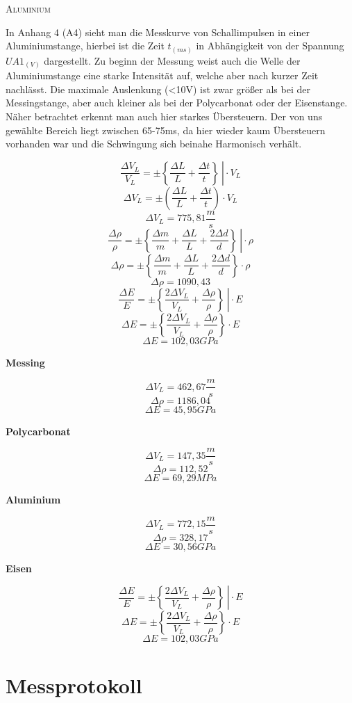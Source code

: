 \documentclass[11pt, a4paper]{article}
\begin{document}
\begin{center}
\textsc{Aluminium}
\end{center}

In Anhang 4 (A4) sieht man die Messkurve von Schallimpulsen in einer Aluminiumstange, hierbei ist die Zeit $t_{(ms)}$ in Abhängigkeit von der Spannung $UA1_{(V)}$ dargestellt. Zu beginn der Messung weist auch die Welle der Aluminiumstange eine starke Intensität auf, welche aber nach kurzer Zeit nachlässt. Die maximale Auslenkung (<10V) ist zwar größer als bei der Messingstange, aber auch kleiner als bei der Polycarbonat oder der Eisenstange. Näher betrachtet erkennt man auch hier starkes Übersteuern. Der von uns gewählte Bereich liegt zwischen 65-75ms, da hier wieder kaum Übersteuern vorhanden war und die Schwingung sich beinahe Harmonisch verhält.

$$\left. \frac{\Delta V_L}{V_L}=\pm \left\{ \frac{\Delta L}{L} + \frac{\Delta t}{t} \right\}\ \right|  \cdot V_L$$
$$\Delta V_L=\pm \left( \frac{\Delta L}{L} + \frac{\Delta t}{t} \right)\cdot V_L$$
$$\Delta V_L=775,81 \frac{m}{s}$$
$$\left. \frac{\Delta \rho}{\rho}=\pm \left\{ \frac{\Delta m}{m} + \frac{\Delta L}{L} + \frac{2\Delta d}{d} \right\}\ \right|  \cdot \rho$$
$$\Delta \rho=\pm \left\{ \frac{\Delta m}{m} + \frac{\Delta L}{L} + \frac{2\Delta d}{d} \right\}\cdot \rho$$
$$\Delta \rho = 1090,43$$
$$\left. \frac{\Delta E}{E}=\pm \left\{ \frac{2\Delta V_L}{V_L} + \frac{\Delta \rho}{\rho	}\right\}\ \right| \cdot E$$
$$\Delta E=\pm \left\{ \frac{2\Delta V_L}{V_L} + \frac{\Delta \rho}{\rho	}\right\}\cdot E$$
$$\Delta E = 102,03 GPa$$

\textbf{Messing}

$$\Delta V_L = 462,67 \frac{m}{s}$$
$$\Delta \rho = 1186,04$$
$$\Delta E  = 45,95 GPa$$

\textbf{Polycarbonat}

$$\Delta V_L = 147,35 \frac{m}{s}$$
$$\Delta \rho = 112,52$$
$$\Delta E  = 69,29 MPa$$

\textbf{Aluminium}

$$\Delta V_L = 772,15 \frac{m}{s}$$
$$\Delta \rho = 328,17 $$
$$\Delta E  = 30,56 GPa$$

\textbf{Eisen}

$$\left. \frac{\Delta E}{E}=\pm \left\{ \frac{2\Delta V_L}{V_L}+\frac{\Delta\rho}{\rho}\right\}\ \right|\cdot E$$
$$\Delta E = \pm \left\{ \frac{2\Delta V_L}{V_L}+\frac{\Delta\rho}{\rho}\right\}\cdot E$$
$$\Delta E = 102,03 GPa$$

\newpage
\section{Messprotokoll}
\end{document}
